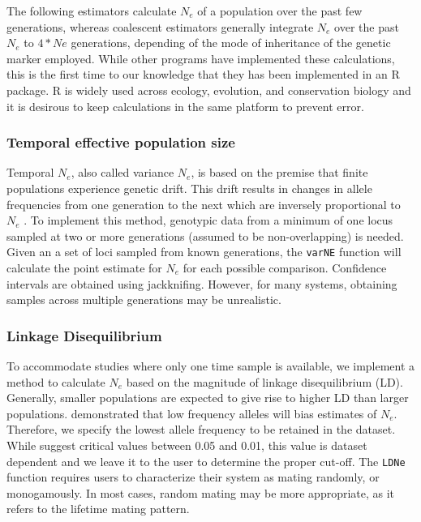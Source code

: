 \documentclass[english,titlepage]{article}
\begin{document}
The following estimators calculate $N_e$ of a population over the past few generations, whereas coalescent estimators generally integrate $N_e$ over the past $N_e$ to $4*Ne$ generations, depending of the mode of inheritance of the genetic marker employed. While other programs have implemented these calculations, this is the first time to our knowledge that they has been implemented in an R package. R is widely used across ecology, evolution, and conservation biology and it is desirous to keep calculations in the same platform to prevent error.

\subsubsection*{Temporal effective population size}

Temporal $N_e$, also called variance $N_e$, is based on the premise that finite populations experience genetic drift. This drift results in changes in allele frequencies from one generation to the next which are inversely proportional to $N_e$ \citep{Nei1981}. To implement this method, genotypic data from a minimum of one locus sampled at two or more generations (assumed to be non-overlapping) is needed.  Given an a set of loci sampled from known generations, the \texttt{varNE} function will calculate the point estimate for $N_e$ for each possible comparison. Confidence intervals are obtained using jackknifing. However, for many systems, obtaining samples across multiple generations may be unrealistic.

\subsubsection*{Linkage Disequilibrium}

To accommodate studies where only one time sample is available, we implement a method to calculate $N_e$ based on the magnitude of linkage disequilibrium (LD). Generally, smaller populations are expected to give rise to higher LD than larger populations. 
\cite{Waples2006} demonstrated that low frequency alleles will bias estimates of $N_e$. Therefore, we specify the lowest allele frequency to be retained in the dataset.  While \cite{Waples2008} suggest critical values between 0.05 and 0.01, this value is dataset dependent and we leave it to the user to determine the proper cut-off. The \texttt{LDNe} function requires users to characterize their system as mating randomly, or monogamously. In most cases, random mating may be more appropriate, as it refers to the lifetime mating pattern. 


  


\end{document}
